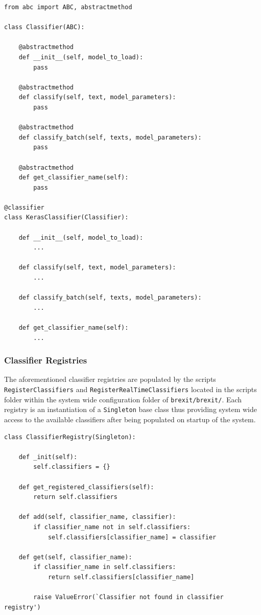 \documentclass[11pt]{report}
\begin{document}
\clearpage
\begin{center}
\begin{lstlisting}
from abc import ABC, abstractmethod

class Classifier(ABC):

    @abstractmethod
    def __init__(self, model_to_load):
        pass

    @abstractmethod
    def classify(self, text, model_parameters):
        pass

    @abstractmethod
    def classify_batch(self, texts, model_parameters):
        pass

    @abstractmethod
    def get_classifier_name(self):
        pass
        
@classifier
class KerasClassifier(Classifier):

    def __init__(self, model_to_load):
        ...

    def classify(self, text, model_parameters):
        ...

    def classify_batch(self, texts, model_parameters):
        ...

    def get_classifier_name(self):
        ...

\end{lstlisting}
\end{center}

\clearpage

\subsubsection*{Classifier Registries}
The aforementioned classifier registries are populated by the scripts \texttt{RegisterClassifiers} and \texttt{RegisterRealTimeClassifiers} located in the scripts folder within the system wide configuration folder of \texttt{brexit/brexit/}. Each registry is an instantiation of a \texttt{Singleton} base class thus providing system wide access to the available classifiers after being populated on startup of the system.

\begin{center}
\begin{lstlisting}
class ClassifierRegistry(Singleton):
 
    def _init(self):
        self.classifiers = {}

    def get_registered_classifiers(self):
        return self.classifiers

    def add(self, classifier_name, classifier):
        if classifier_name not in self.classifiers:
            self.classifiers[classifier_name] = classifier

    def get(self, classifier_name):
        if classifier_name in self.classifiers:
            return self.classifiers[classifier_name]

        raise ValueError(`Classifier not found in classifier registry')
\end{lstlisting}
\end{center}
\end{document}
